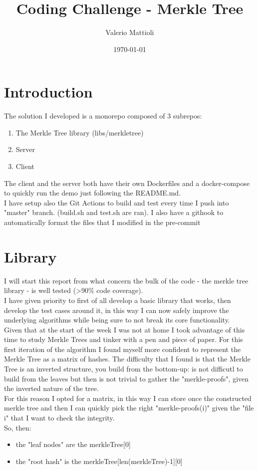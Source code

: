 \documentclass[11pt]{article}
\author{Valerio Mattioli}
\date{\today}
\title{Coding Challenge - Merkle Tree}
\begin{document}
\maketitle
\tableofcontents


\section{Introduction}
\label{sec:org08913f3}
The solution I developed is a monorepo composed of 3 subrepos:
\begin{enumerate}
\item The Merkle Tree library (libs/merkletree)
\item Server
\item Client
\end{enumerate}
The client and the server both have their own Dockerfiles and a docker-compose to quickly run the demo just following the README.md.\\[0pt]
I have setup also the Git Actions to build and test every time I push into "master" branch. (build.sh and test.sh are ran).
I also have a githook to automatically format the files that I modified in the pre-commit
\section{Library}
\label{sec:org98278eb}
I will start this report from what concern the bulk of the code - the merkle tree library - is well tested (>90\% code coverage).\\[0pt]
I have given priority to first of all develop a basic library that works, then develop the test cases around it, in this way I can now safely improve the underlying algorithms while being sure to not break its core functionality.\\[0pt]
Given that at the start of the week I was not at home I took advantage of this time to study Merkle Trees and tinker with a pen and piece of paper.
For this first iteration of the algorithm I found myself more confident to represent the Merkle Tree as a matrix of hashes. The difficulty that I found is that the Merkle Tree is an inverted structure, you build from the bottom-up: is not difficutl to build from the leaves but then is not trivial to gather the "merkle-proofs", given the inverted nature of the tree.\\[0pt]
For this reason I opted for a matrix, in this way I can store once the constructed merkle tree and then I can quickly pick the right "merkle-proofs(i)" given the "file i" that I want to check the integrity.\\[0pt]
So, then:
\begin{itemize}
\item the "leaf nodes" are the merkleTree[0]
\item the "root hash" is the merkleTree[len(merkleTree)-1][0]\\[0pt]
\end{itemize}
\end{document}
